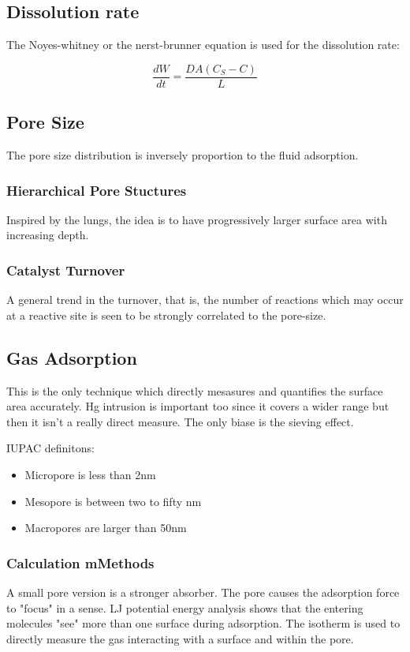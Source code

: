 \documentclass[12pt,a4paper,oneside,headinclude]{scrartcl}
\numberwithin{figure}{section}
\numberwithin{equation}{section}
\numberwithin{table}{section}
\begin{document}
\subsection{Dissolution rate}
\label{sec:orgf0c1078}
The Noyes-whitney or the nerst-brunner equation is used for the dissolution rate:

$$\frac{dW}{dt}=\frac{DA(C_S-C)}{L}$$
\subsection{Pore Size}
\label{sec:org18127c3}
The pore size distribution is inversely proportion to the fluid adsorption.
\subsubsection{Hierarchical Pore Stuctures}
\label{sec:orgc1ca14b}
Inspired by the lungs, the idea is to have progressively larger surface area
with increasing depth.
\subsubsection{Catalyst Turnover}
\label{sec:org3389dbf}
A general trend in the turnover, that is, the number of reactions which may
occur at a reactive site is seen to be strongly correlated to the pore-size.
\subsection{Gas Adsorption}
\label{sec:orgedccf22}
This is the only technique which directly mesasures and quantifies the surface
area accurately. Hg intrusion is important too since it covers a wider range but
then it isn't a really direct measure.
The only biase is the sieving effect.

IUPAC definitons:
\begin{itemize}
\item Micropore is less than 2nm
\item Mesopore is between two to fifty nm
\item Macropores are larger than 50nm
\end{itemize}
\subsubsection{Calculation mMethods}
\label{sec:org5499efe}
A small pore version is a stronger absorber. The pore causes the adsorption
force to "focus" in a sense. LJ potential energy analysis shows that the
entering molecules "see" more than one surface during adsorption. The isotherm
is used to directly measure the gas interacting with a surface and within the pore.
\end{document}

